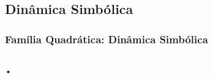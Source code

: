 \subsection{Dinâmica Simbólica}


\begin{frame}
\vspace{5pt}
\frametitle{Família Quadrática: Dinâmica Simbólica}
\begin{columns}
\column{\dimexpr\paperwidth-15pt}

•

\end{columns}
\end{frame}

